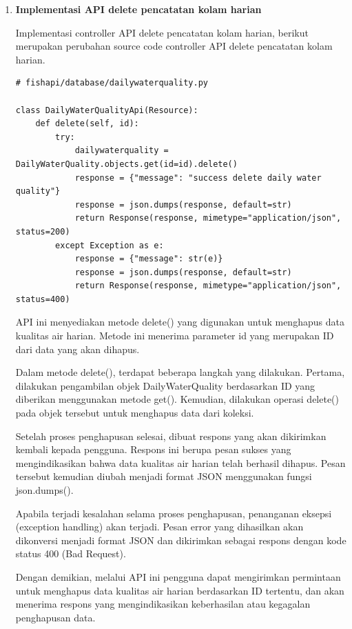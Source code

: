 \begin{enumerate}[1.]
\begin{lstlisting}
{
  "message": "success change data daily water quality",
  "id": "62e89ce7846724c2d2984687"
}
\end{lstlisting}



\item \textbf{Implementasi API delete pencatatan kolam harian}

Implementasi controller API delete pencatatan kolam harian, berikut merupakan perubahan source code controller API delete pencatatan kolam harian.

\begin{lstlisting}
# fishapi/database/dailywaterquality.py

class DailyWaterQualityApi(Resource):
    def delete(self, id):
        try:
            dailywaterquality = DailyWaterQuality.objects.get(id=id).delete()
            response = {"message": "success delete daily water quality"}
            response = json.dumps(response, default=str)
            return Response(response, mimetype="application/json", status=200)
        except Exception as e:
            response = {"message": str(e)}
            response = json.dumps(response, default=str)
            return Response(response, mimetype="application/json", status=400)
\end{lstlisting}


API ini menyediakan metode delete() yang digunakan untuk menghapus data kualitas air harian. Metode ini menerima parameter id yang merupakan ID dari data yang akan dihapus.

Dalam metode delete(), terdapat beberapa langkah yang dilakukan. Pertama, dilakukan pengambilan objek DailyWaterQuality berdasarkan ID yang diberikan menggunakan metode get(). Kemudian, dilakukan operasi delete() pada objek tersebut untuk menghapus data dari koleksi.

Setelah proses penghapusan selesai, dibuat respons yang akan dikirimkan kembali kepada pengguna. Respons ini berupa pesan sukses yang mengindikasikan bahwa data kualitas air harian telah berhasil dihapus. Pesan tersebut kemudian diubah menjadi format JSON menggunakan fungsi json.dumps().

Apabila terjadi kesalahan selama proses penghapusan, penanganan eksepsi (exception handling) akan terjadi. Pesan error yang dihasilkan akan dikonversi menjadi format JSON dan dikirimkan sebagai respons dengan kode status 400 (Bad Request).

Dengan demikian, melalui API ini pengguna dapat mengirimkan permintaan untuk menghapus data kualitas air harian berdasarkan ID tertentu, dan akan menerima respons yang mengindikasikan keberhasilan atau kegagalan penghapusan data.


\end{enumerate}
